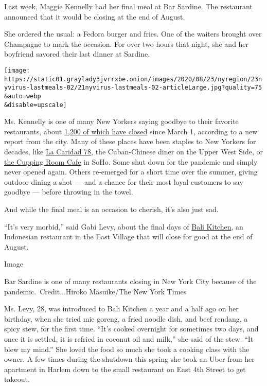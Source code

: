 Last week, Maggie Kennelly had her final meal at Bar Sardine. The
restaurant announced that it would be closing at the end of August.

She ordered the usual: a Fedora burger and fries. One of the waiters
brought over Champagne to mark the occasion. For over two hours that
night, she and her boyfriend savored their last dinner at Sardine.

\texttt{[image: https://static01.graylady3jvrrxbe.onion/images/2020/08/23/nyregion/23nyvirus-lastmeals-02/21nyvirus-lastmeals-02-articleLarge.jpg?quality=75\\\&auto=webp\\\&disable=upscale]}

Ms. Kennelly is one of many New Yorkers saying goodbye to their favorite
restaurants, about
\href{https://comptroller.nyc.gov/newsroom/comptroller-stringer-proposes-save-main-street-initiative-for-small-businesses-fighting-for-survival/}{1,200
of which have closed} since March 1, according to a new report from the
city. Many of these places have been staples to New Yorkers for decades,
like
\href{https://www.nytimes3xbfgragh.onion/2020/07/24/dining/la-caridad-78-closes.html}{La
Caridad 78}, the Cuban-Chinese diner on the Upper West Side, or
\href{https://www.instagram.com/p/CBlInSpjQW7/}{the Cupping Room Cafe}
in SoHo. Some shut down for the pandemic and simply never opened again.
Others re-emerged for a short time over the summer, giving outdoor
dining a shot --- and a chance for their most loyal customers to say
goodbye --- before throwing in the towel.

And while the final meal is an occasion to cherish, it's also just sad.

``It's very morbid,'' said Gabi Levy, about the final days of
\href{https://www.balikitchennyc.com/}{Bali Kitchen}, an Indonesian
restaurant in the East Village that will close for good at the end of
August.

Image

Bar Sardine is one of many restaurants closing in New York City because
of the pandemic.~Credit...Hiroko Masuike/The New York Times

Ms. Levy, 28, was introduced to Bali Kitchen a year and a half ago on
her birthday, when she tried mie goreng, a fried noodle dish, and beef
rendang, a spicy stew, for the first time. ``It's cooked overnight for
sometimes two days, and once it is settled, it is refried in coconut oil
and milk,'' she said of the stew. ``It blew my mind.'' She loved the
food so much she took a cooking class with the owner. A few times during
the shutdown this spring she took an Uber from her apartment in Harlem
down to the small restaurant on East 4th Street to get takeout.

